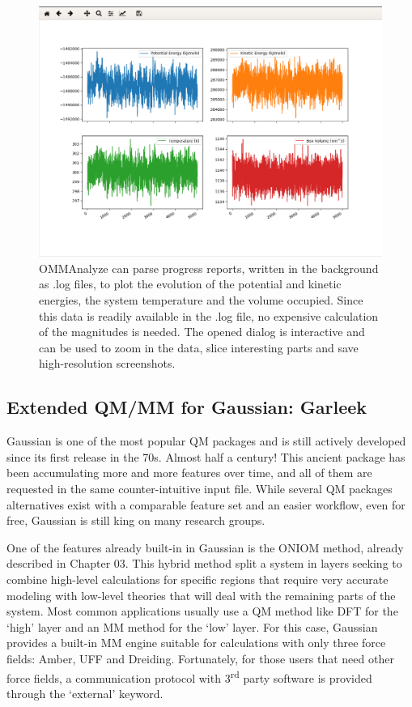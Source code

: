 \begin{figure}[H] %
	\begin{Center}
		\includegraphics[width=\textwidth]{./figures/05/ommanalyze.png}
	\end{Center}
	\caption[Example results with OMMAnalyze]{OMMAnalyze can parse progress reports, written in the background as .log files, to plot the evolution of the potential and kinetic energies, the system temperature and the volume occupied. Since this data is readily available in the .log file, no expensive calculation of the magnitudes is needed. The opened dialog is interactive and can be used to zoom in the data, slice interesting parts and save high-resolution screenshots.}
	\label{fig:ommanalyze}
\end{figure}


\subsection{Extended QM/MM for Gaussian: Garleek}


Gaussian is one of the most popular QM packages and is still actively developed since its first release in the 70s. Almost half a century! This ancient package has been accumulating more and more features over time, and all of them are requested in the same counter-intuitive input file. While several QM packages alternatives exist with a comparable feature set and an easier workflow, even for free, Gaussian is still king on many research groups.

One of the features already built-in in Gaussian is the ONIOM method, already described in Chapter 03. This hybrid method split a system in layers seeking to combine high-level calculations for specific regions that require very accurate modeling with low-level theories that will deal with the remaining parts of the system. Most common applications usually use a QM method like DFT for the ‘high’ layer and an MM method for the ‘low’ layer. For this case, Gaussian provides a built-in MM engine suitable for calculations with only three force fields: Amber, UFF and Dreiding. Fortunately, for those users that need other force fields, a communication protocol with 3\textsuperscript{rd} party software is provided through the ‘external’ keyword.


